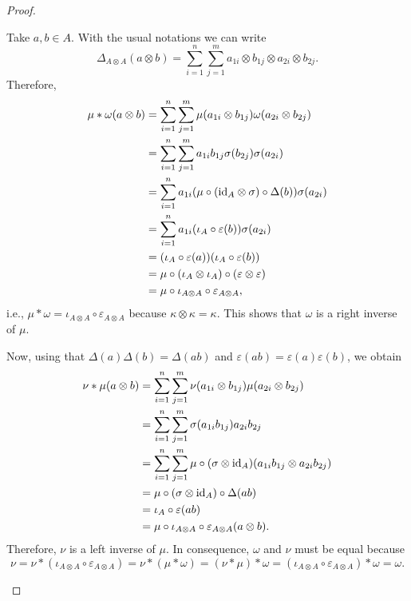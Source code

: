 \begin{proof}
\begin{enumerate}[\rm a)]
        Take $a,b\in A$. With the usual notations we can write
        $$
            \Delta_{A\otimes A}(a\otimes b) = \sum_{i=1}^n\sum_{j=1}^m
                a_{1i}\otimes b_{1j}\otimes a_{2i}\otimes b_{2j}.
        $$
        Therefore,
        \begin{align*}
            \mu * \omega(a\otimes b) &= \sum_{i=1}^n\sum_{j=1}^m
                \mu(a_{1i}\otimes b_{1j})\omega(a_{2i}\otimes b_{2j})\\
            &= \sum_{i=1}^n\sum_{j=1}^m
                a_{1i}b_{1j}\sigma(b_{2j})\sigma(a_{2i})\\
            &= \sum_{i=1}^na_{1i}(\mu\circ(\text{\rm id}_A\otimes\sigma)\circ\Delta(b))\sigma(a_{2i})\\
            &= \sum_{i=1}^na_{1i}(\iota_A\circ\varepsilon(b))\sigma(a_{2i})\\
            &= (\iota_A\circ\varepsilon(a))
                (\iota_A\circ\varepsilon(b))\\
            &= \mu\circ(\iota_A\otimes\iota_A)
                \circ(\varepsilon\otimes\varepsilon)\\
            &= \mu\circ\iota_{A\otimes A}\circ\varepsilon_{A\otimes A},
        \end{align*}
        i.e., $\mu*\omega = \iota_{A\otimes A}\circ\varepsilon_{A\otimes A}$ because $\kappa\otimes\kappa=\kappa$. This shows that $\omega$ is a right inverse of $\mu$.

        Now, using that $\Delta(a)\Delta(b)=\Delta(ab)$ and $\varepsilon(ab)=\varepsilon(a)\varepsilon(b)$, we obtain
        \begin{align*}
            \nu*\mu(a\otimes b) &= \sum_{i=1}^n\sum_{j=1}^m
                    \nu(a_{1i}\otimes b_{1j})\mu(a_{2i}\otimes b_{2j})\\
                &= \sum_{i=1}^n\sum_{j=1}^m\sigma(a_{1i}b_{1j})a_{2i}b_{2j}\\
                &= \sum_{i=1}^n\sum_{j=1}^m
                    \mu\circ(\sigma\otimes\text{\rm id}_A)
                    (a_{1i}b_{1j}\otimes a_{2i}b_{2j})\\
                &= \mu\circ(\sigma\otimes\text{\rm id}_A)\circ\Delta(ab)\\
                &= \iota_A\circ\varepsilon(ab)\\
                &= \mu\circ\iota_{A\otimes A}
                    \circ\varepsilon_{A\otimes A}(a\otimes b).
        \end{align*}
        Therefore, $\nu$ is a left inverse of $\mu$. In consequence, $\omega$ and $\nu$ must be equal because
        $$
            \nu = \nu*(\iota_{A\otimes A}\circ\varepsilon_{A\otimes A})
                = \nu * (\mu*\omega)
                = (\nu*\mu)*\omega 
                = (\iota_{A\otimes A}\circ\varepsilon_{A\otimes A}) * \omega
                = \omega.
        $$
    \end{enumerate}
\end{proof}

